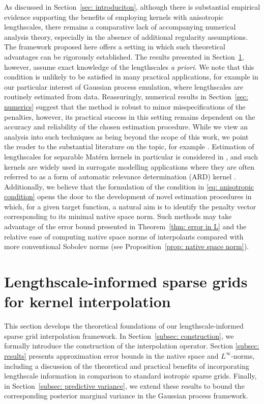 \documentclass[pdflatex,sn-mathphys-num]{sn-jnl}%
\theoremstyle{thmstyleone}%
\theoremstyle{thmstyletwo}%
\theoremstyle{thmstylethree}%
\begin{document}
As discussed in Section~\ref{sec: introduciton}, although there is substantial empirical evidence supporting the benefits of employing kernels with anisotropic lengthscales, there remains a comparative lack of accompanying numerical analysis theory, especially in the absence of additional regularity assumptions. The framework proposed here offers a setting in which such theoretical advantages can be rigorously established. The results presented in Section~\ref{sec: results}, however, assume exact knowledge of the lengthscales \emph{a priori}. We note that this condition is unlikely to be satisfied in many practical applications, for example in our particular interest of Gaussian process emulation, where lengthscales are routinely estimated from data. Reassuringly, numerical results in  Section~\ref{sec: numerics} suggest that the method is robust to minor misspecifications of the penalties, however, its practical success in this setting remains dependent on the accuracy and reliability of the chosen estimation procedure. While we view an analysis into such techniques as being beyond the scope of this work, we point the reader to the substantial literature on the topic, for example \cite{Rasmussen2005, mardia1984, Sundararajan2001, hyperparamEstimationInverse}.
Estimation of lengthscales for separable Mat\'ern kernels in particular is considered in \cite{Briol2019}, and such kernels are widely used in surrogate modelling applications where they are often referred to as a form of automatic relevance determination (ARD) kernel \cite{geophysExampleARD,ZHANG2021100188}. Additionally, we believe that the formulation of the condition in \eqref{eq: anisotropic condition} opens the door to the development of novel estimation procedures in which, for a given target function, a natural aim is to identify the penalty vector corresponding to its minimal native space norm. Such methods may take advantage of the error bound presented in Theorem~\ref{thm: error in L} and the relative ease of computing native space norms of interpolants compared with more conventional Sobolev norms (see Proposition~\ref{prop: native space norm}).



\section{Lengthscale-informed sparse grids for kernel interpolation}\label{sec: results}
This section develops the theoretical foundations of our lengthscale-informed sparse grid interpolation framework. In Section~\ref{subsec: construction}, we formally introduce the construction of the interpolation operator. Section \ref{subsec: results} presents approximation error bounds in the native space and \(L^\infty\)-norms, including a discussion of the theoretical and practical benefits of incorporating lengthscale information in comparison to standard isotropic sparse grids. Finally, in Section~\ref{subsec: predictive variance}, we extend these results to bound the corresponding posterior marginal variance in the Gaussian process framework.
\end{document}
